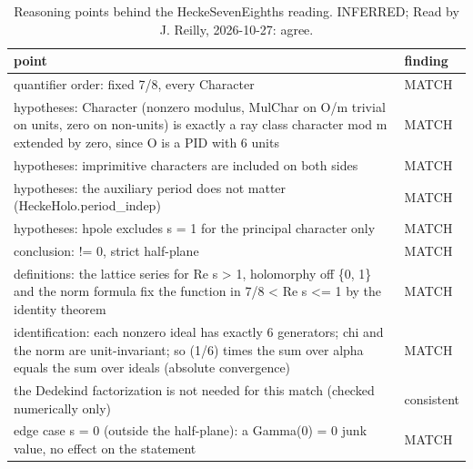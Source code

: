 \begin{table}[!htbp]
\caption{Reasoning points behind the HeckeSevenEighths reading. INFERRED; Read by J. Reilly, 2026-10-27: agree.}\label{tab:points-HeckeSevenEighths} %
\scriptsize\setlength{\tabcolsep}{3pt}\renewcommand{\arraystretch}{0.95}
\begin{tabularx}{\textwidth}{@{}>{\raggedright\arraybackslash}Xl@{}}
\toprule
point & finding \\ %
\midrule
quantifier order: fixed 7/8, every Character & MATCH \\ %
hypotheses: Character (nonzero modulus, MulChar on O/m trivial on units, zero on non-units) is exactly a ray class character mod m extended by zero, since O is a PID with 6 units & MATCH \\ %
hypotheses: imprimitive characters are included on both sides & MATCH \\ %
hypotheses: the auxiliary period does not matter (HeckeHolo.period\_indep) & MATCH \\ %
hypotheses: hpole excludes s = 1 for the principal character only & MATCH \\ %
conclusion: != 0, strict half-plane & MATCH \\ %
definitions: the lattice series for Re s > 1, holomorphy off \{0, 1\} and the norm formula fix the function in 7/8 < Re s <= 1 by the identity theorem & MATCH \\ %
identification: each nonzero ideal has exactly 6 generators; chi and the norm are unit-invariant; so (1/6) times the sum over alpha equals the sum over ideals (absolute convergence) & MATCH \\ %
the Dedekind factorization is not needed for this match (checked numerically only) & consistent \\ %
edge case s = 0 (outside the half-plane): a Gamma(0) = 0 junk value, no effect on the statement & MATCH \\ %
\bottomrule
\end{tabularx}
\end{table}
